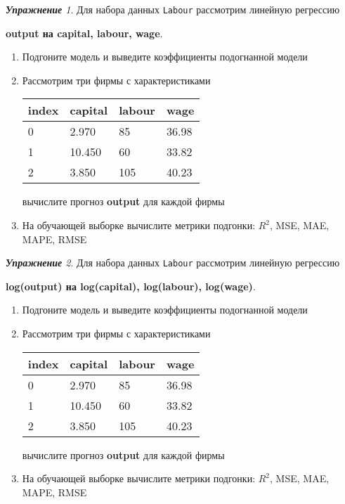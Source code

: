 \documentclass[a4,12pt]{article}
\theoremstyle{remark}
\newtheorem{exercise}{\textbf{Упражнение}}[section]
\begin{document}
\begin{exercise}
Для набора данных \texttt{Labour} рассмотрим линейную регрессию 
\begin{center}
	\textbf{output на capital, labour, wage}.
\end{center}
\begin{enumerate}
	\item Подгоните модель и выведите коэффициенты подогнанной модели
	\item Рассмотрим три фирмы с характеристиками
	\begin{center}
		\begin{tabular}{|l||l|l|l|}\hline
			index & capital & labour & wage \\ \hline\hline
			0 & 2.970 & 85 & 36.98\\
			1 & 10.450 & 60 & 33.82  \\
			2 & 3.850 & 105 & 40.23\\ \hline
		\end{tabular}
	\end{center}
	вычислите прогноз \textbf{output} для каждой фирмы
	\item На обучающей выборке вычислите метрики подгонки: \(R^2\), 
	MSE, MAE, MAPE, RMSE
\end{enumerate}
\end{exercise}

\begin{exercise}
Для набора данных \texttt{Labour} рассмотрим линейную регрессию 
\begin{center}
	\textbf{log(output) на log(capital), log(labour), log(wage)}.
\end{center}
\begin{enumerate}
	\item Подгоните модель и выведите коэффициенты подогнанной модели
	\item Рассмотрим три фирмы с характеристиками
	\begin{center}
		\begin{tabular}{|l||l|l|l|}\hline
			index & capital & labour & wage \\ \hline\hline
			0 & 2.970 & 85 & 36.98\\
			1 & 10.450 & 60 & 33.82  \\
			2 & 3.850 & 105 & 40.23\\ \hline
		\end{tabular}
	\end{center}
	вычислите прогноз \textbf{output} для каждой фирмы
	\item На обучающей выборке вычислите метрики подгонки: \(R^2\), 
	MSE, MAE, MAPE, RMSE
\end{enumerate}
\end{exercise}
\end{document}
